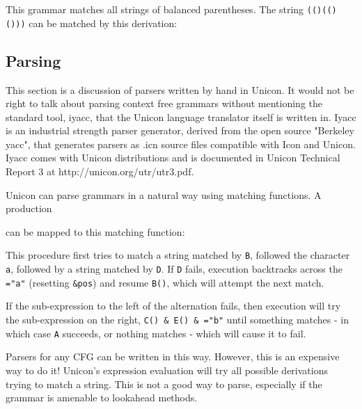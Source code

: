This grammar matches all strings of balanced parentheses. The string
\texttt{(()(()()))} can be matched by this derivation:


\subsection*{Parsing}

This section is a discussion of parsers written by hand in Unicon.
It would not be right to talk about parsing context free grammars
without mentioning the standard tool, iyacc, that the Unicon language
translator itself is written in.  Iyacc is an industrial strength
parser generator, derived from the open source "Berkeley yacc", that
generates parsers as .icn source files compatible with Icon and Unicon.
Iyacc comes with Unicon distributions and is documented in Unicon Technical
Report 3 at http://unicon.org/utr/utr3.pdf. 

Unicon can parse grammars in a natural way using matching
functions. A production


\noindent
can be mapped to this matching function:


\noindent
This procedure first tries to match a string matched by \texttt{B},
followed the character \texttt{a}, followed by a string matched by
\texttt{D}. If \texttt{D} fails, execution
backtracks across the \texttt{="a"}
(resetting \texttt{\&pos}) and resume \texttt{B()}, which will attempt
the next match.

If the sub-expression to the left of the alternation fails, then execution will try the
sub-expression on the right, \texttt{C() \& E() \&
="b"} until something matches - in which
case \texttt{A} succeeds, or nothing matches - which will cause it to
fail.

Parsers for any CFG can be written in this way. However, this is an
expensive way to do it! Unicon's
expression evaluation will try all possible derivations
trying to match a string. This is not a good way to parse, especially
if the grammar is amenable to lookahead methods.

